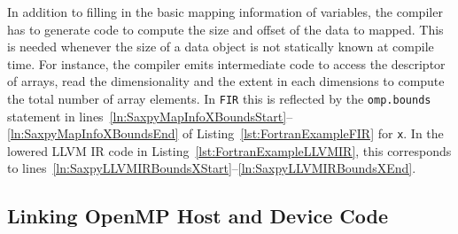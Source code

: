 \documentclass[acmtog,natbib=false]{acmart}
\newcommand{\code}[1]{\texttt{#1}\xspace}
\begin{document}

In addition to filling in the basic mapping information of variables, the compiler has to generate code to compute the size and offset of the data to mapped.
This is needed whenever the size of a data object is not statically known at compile time.
For instance, the compiler emits intermediate code to access the descriptor of arrays, read the dimensionality and the extent in each dimensions to compute the total number of array elements.
In \code{FIR} this is reflected by the \code{omp.bounds} statement in lines~\ref{ln:SaxpyMapInfoXBoundsStart}--\ref{ln:SaxpyMapInfoXBoundsEnd} of Listing~\ref{lst:FortranExampleFIR} for \code{x}.
In the lowered LLVM \ac{IR} code in Listing~\ref{lst:FortranExampleLLVMIR}, this corresponds to lines~\ref{ln:SaxpyLLVMIRBoundsXStart}--\ref{ln:SaxpyLLVMIRBoundsXEnd}.




\subsection{Linking OpenMP Host and Device Code}
\label{sec:LinkingOpenMPHostandDeviceCode}
\end{document}
